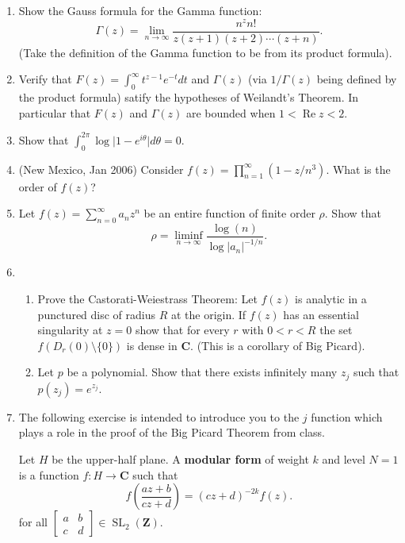 \documentclass[a4paper,10pt]{article}
\title{}
\author{Dupuy --- Complex Analysis --- Spring 2017 --- Homework 07}
\date{}
\newcommand{\ZZ}{\mathbf{Z}}
\newcommand{\CC}{\mathbf{C}}
\renewcommand{\Re}{\operatorname{Re}}
\newcommand{\SL}{\operatorname{SL}}
\begin{document}
\maketitle 

\begin{enumerate}
\item Show the Gauss formula for the Gamma function:
 $$ \Gamma(z) = \lim_{n\to\infty} \frac{n^z n!}{z(z+1)(z+2) \cdots (z+n)}. $$
(Take the definition of the Gamma function to be from its product formula).
\item Verify that $F(z) = \int_0^{\infty} t^{z-1}e^{-t}dt$ and $\Gamma(z)$ (via $1/\Gamma(z)$ being defined by the product formula) satify the hypotheses of Weilandt's Theorem. In particular that $F(z)$ and $\Gamma(z)$ are bounded when $1 <\Re z <2$. 

\item Show that $\int_0^{2\pi} \log \vert 1 - e^{i\theta}\vert d\theta=0$.

\item (New Mexico, Jan 2006)
Consider $f(z) = \prod_{n=1}^{\infty}(1-z/n^3)$.
What is the order of $f(z)$?

\item Let $f(z) = \sum_{n=0}^{\infty} a_n z^n$ 
be an entire function of finite order $\rho$. Show that 
 $$ \rho = \liminf_{n\to\infty} \frac{\log(n)}{\log \vert a_n \vert^{-1/n}}.$$

\item 
\begin{enumerate}
\item Prove the Castorati-Weiestrass Theorem: Let $f(z)$ is analytic in a punctured disc of radius $R$ at the origin. If $f(z)$ has an essential singularity at $z=0$ show that for every $r$ with $0<r<R$ the set $f(D_r(0)\setminus \lbrace 0 \rbrace)$ is dense in $\CC$. (This is a corollary of Big Picard).
\item Let $p$ be a polynomial. Show that there exists infinitely many $z_j$ such that $p(z_j) = e^{z_j}$.
\end{enumerate}

\item 
The following exercise is intended to introduce you to the $j$ function which plays a role in the proof of the Big Picard Theorem from class. 

Let $H$ be the upper-half plane. 
A \textbf{modular form} of weight $k$ and level $N=1$ is a function $f:H \to \CC$ such that  
\begin{equation}
 f( \frac{az+b}{cz+d} ) = (cz+d)^{-2k} f(z).
\end{equation}
for all $\left[\begin{matrix}
a & b \\
c & d 
\end{matrix} \right ]\in \SL_2(\ZZ)$. 


\end{enumerate}
\end{document}
